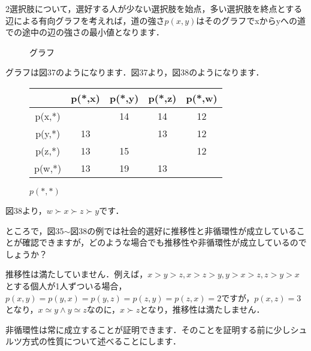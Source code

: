 2選択肢について，選好する人が少ない選択肢を始点，多い選択肢を終点とする辺による有向グラフを考えれば，道の強さ$p(x,y)$はそのグラフでxからyへの道での途中の辺の強さの最小値となります．
\begin{figure}[!h]
    \centering
    \caption{グラフ}
\end{figure}
グラフは図37のようになります．図37より，図38のようになります．
\begin{figure}[!h]
    \centering
    \begin{tabular}[!h]{|c|c|c|c|c|} \hline
               & p(*,x) & p(*,y) & p(*,z) & p(*,w) \\ \hline
        p(x,*) &        & 14     & 14     & 12     \\ \hline
        p(y,*) & 13     &        & 13     & 12     \\ \hline
        p(z,*) & 13     & 15     &        & 12     \\ \hline
        p(w,*) & 13     & 19     & 13     &        \\ \hline
    \end{tabular}
    \caption{$p(*,*)$}
\end{figure}
図38より，$w \succ x \succ z \succ y$です．

ところで，図35$\sim$図38の例では社会的選好に推移性と非循環性が成立していることが確認できますが，どのような場合でも推移性や非循環性が成立しているのでしょうか？

推移性は満たしていません．例えば，$x > y > z, x > z > y, y > x > z, z > y > x$とする個人が1人ずついる場合，$p(x,y) = p(y,x) = p(y,z) = p(z,y) = p(z,x) = 2$ですが，$p(x,z) = 3$となり，$x \simeq y \land y \simeq z$なのに，$x \succ z$となり，推移性は満たしません．

非循環性は常に成立することが証明できます．そのことを証明する前に少しシュルツ方式の性質について述べることにします．

